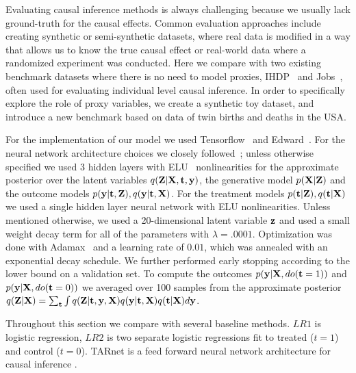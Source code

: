 Evaluating causal inference methods is always challenging because we usually lack ground-truth for the causal effects. Common evaluation approaches include creating synthetic or semi-synthetic datasets, where real data is modified in a way that allows us to know the true causal effect or real-world data where a randomized experiment was conducted. Here we compare with two existing benchmark datasets where there is no need to model proxies, IHDP~\citep{hill2011bayesian} and Jobs~\citep{lalonde1986evaluating}, often used for evaluating individual level causal inference. In order to specifically explore the role of proxy variables, we create a synthetic toy dataset, and introduce a new benchmark based on data of twin births and deaths in the USA.

For the implementation of our model we used Tensorflow~\citep{abadi2016tensorflow} and Edward~\citep{tran2016edward}. For the neural network architecture choices we closely followed~\cite{shalit2016estimating}; unless otherwise specified we used 3 hidden layers with ELU~\citep{clevert2015fast} nonlinearities for the approximate posterior over the latent variables $q(\mathbf{Z}|\mathbf{X}, \mathbf{t}, \mathbf{y})$, the generative model $p(\mathbf{X}|\mathbf{Z})$ and the outcome models $p(\mathbf{y}|\mathbf{t},\mathbf{Z}), q(\mathbf{y}|\mathbf{t},\mathbf{X})$. For the treatment models $p(\mathbf{t}|\mathbf{Z}),q(\mathbf{t}|\mathbf{X})$ we used a single hidden layer neural network with ELU nonlinearities. Unless mentioned otherwise, we used a 20-dimensional latent variable $\mathbf{z}$ and used a small weight decay term for all of the parameters with $\lambda = .0001$. Optimization was done with Adamax~\citep{kingma2014adam} and a learning rate of $0.01$, which was annealed with an exponential decay schedule. We further performed early stopping according to the lower bound on a validation set. To compute the outcomes $p(\mathbf{y}|\mathbf{X}, do(\mathbf{t}=1))$ and $p(\mathbf{y}|\mathbf{X}, do(\mathbf{t}=0))$ we averaged over 100 samples from the approximate posterior $q(\mathbf{Z}|\mathbf{X}) = \sum_{\mathbf{t}} \int q(\mathbf{Z}|\mathbf{t},\mathbf{y},\mathbf{X})q(\mathbf{y}|\mathbf{t},\mathbf{X})q(\mathbf{t}|\mathbf{X}) d\mathbf{y}$.

Throughout this section we compare with several baseline methods. $LR1$ is logistic regression, $LR2$ is two separate logistic regressions fit to treated ($t=1$) and control ($t=0$). TARnet is a feed forward neural network architecture for causal inference \citep{shalit2016estimating}. 

